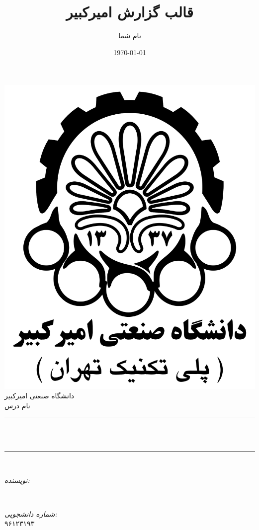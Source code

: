 \documentclass[12pt]{article}
\title{قالب گزارش امیرکبیر}                             %
\author{نام شما}                               %
\date{\today}                                           %
\makeatletter
\let\thetitle\@title
\let\theauthor\@author
\makeatother
\begin{document}

\begin{titlepage}
    \centering
    \vspace*{0.5 cm}
    \includegraphics[scale = 0.1]{logo.png}\\[1.0 cm]   %
    \textsc{\LARGE دانشگاه صنعتی امیرکبیر}\\[2.0 cm]   %
    \textsc{\Large نام درس}\\[0.5 cm]               %
    \rule{\linewidth}{0.2 mm} \\[0.4 cm]
    { \huge \bfseries \thetitle}\\
    \rule{\linewidth}{0.2 mm} \\[1.5 cm]
    
    \begin{minipage}{0.4\textwidth}
        \begin{flushright} \large
            \emph{نویسنده:}\\
            \theauthor
        \end{flushright}
    \end{minipage}~
    \begin{minipage}{0.4\textwidth}
        \begin{flushleft} \large
            \emph{شماره دانشجویی:} \\
            ۹۶۱۲۳۱۹۳                                   %
        \end{flushleft}
    \end{minipage}\\[2 cm]
    

\end{titlepage}
\end{document}
